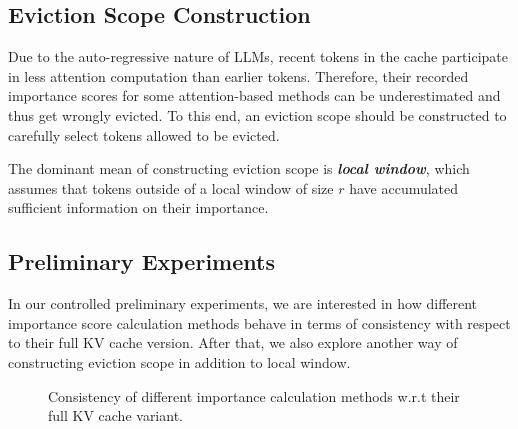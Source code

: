 \subsection{Eviction Scope Construction}
\label{sec:esc}
Due to the auto-regressive nature of LLMs, recent tokens in the cache participate in less attention computation than earlier tokens. Therefore, their recorded importance scores for some attention-based methods can be underestimated and thus get wrongly evicted. To this end, an eviction scope should be constructed to carefully select tokens allowed to be evicted.

The dominant mean of constructing eviction scope is 
 \textit{\textbf{local window}}, which assumes that tokens outside of a 
local window of size $r$ have accumulated sufficient information on their importance.

\subsection{Preliminary Experiments}
\label{sec:preliminary}
In our controlled preliminary experiments, we are interested in how different importance 
score calculation methods behave in terms of consistency with respect to 
their full KV cache version. After that, we also explore another way of constructing 
eviction scope in addition to local window.

\begin{figure}[t]
	\centering
	\caption{Consistency of different importance calculation methods w.r.t their full KV cache variant.}
	\label{fig:consistency}
\end{figure}

